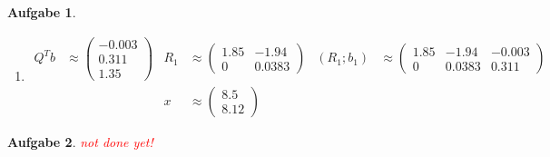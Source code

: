 \documentclass[11pt]{article}
\theoremstyle{break}
\newtheorem{task}{Aufgabe}
\def\ndy{
    \textcolor{red} {\hfill not done yet!}
    \reversemarginpar
    \marginpar{\raggedleft\textcolor{red}{\rule{2mm}{2mm}}}
}
\begin{document}
\begin{task}
\begin{enumerate}[label={(\alph*)}]
\begin{align*}
\begin{pmatrix}
                -0.577 & 0.243 & -0.797\\
                -0.577 & -0.797 & 0.243
            \end{pmatrix}\\
            &&R&\approx \begin{pmatrix}
                1.85 & -1.94\\
                0 & 0.0383\\
                0 & 0
            \end{pmatrix}\\
        \end{align*}
        Anmerkung: Ich habe vergessen, bei den Normen / der Berechnung von $\alpha$ zu runden. Das habe ich allerdings zu spät bermerkt und jetzt will ich nicht alles nochmal umschreiben. Außerdem haben wir am Anfang mal definiert, dass am Ende einer Gleitkommazahl nicht nur 9en sind. Deswegen wurde die ein oder andere $0.0399$ zu einer $0.04$ etc.
        \item \begin{align*}
            Q^T b &\approx \begin{pmatrix}
                -0.003\\
                0.311\\
                1.35
            \end{pmatrix}& R_1 &\approx \begin{pmatrix}
                1.85 & -1.94\\
                0 & 0.0383
            \end{pmatrix}& (R_1;b_1) &\approx \left(\begin{array}{cc|c}
                1.85 & -1.94 & -0.003\\
                0 & 0.0383 & 0.311
            \end{array}\right)\\
            &&x&\approx\begin{pmatrix}
                8.5\\
                8.12
            \end{pmatrix}
        \end{align*}
    \end{enumerate}
\end{task}
\begin{task}
    \ndy
\end{task}
\end{document}
